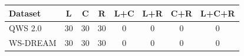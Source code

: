\begin{tabular}{lccccccc}
\toprule
Dataset & L & C & R & L+C & L+R & C+R & L+C+R \\
\midrule
QWS 2.0 & 30 & 30 & 30 & 0 & 0 & 0 & 0 \\
WS-DREAM & 30 & 30 & 30 & 0 & 0 & 0 & 0 \\
\bottomrule
\end{tabular}
